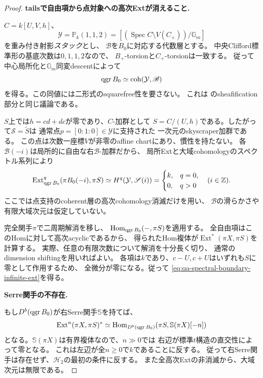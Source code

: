 \begin{proof}
\par\medskip\noindent\textbf{tailsで自由項から点対象への高次Extが消えること.}\par\nobreak\smallskip
$C=k[U,V,h]$、
\[
 \mathcal Y=\mathbb P_k(1,1,2)
 =[(\operatorname{Spec}C\setminus V(C_+))/\mathbb G_m]
\]
を重み付き射影\emph{スタック}とし、
$\mathscr B$を$B_0$に対応する代数層とする。
中央Clifford標準形の基底次数は$0,1,1,2$なので、
$B_+$-torsionと$C_+$-torsionは一致する。
従って中心局所化と$\mathbb G_m$同変descentによって
\[
 \operatorname{qgr} B_0\simeq\operatorname{coh}(\mathcal Y,\mathscr B)
\]
を得る。この同値には二形式のsquarefree性を要さない。
これは\cite[\texttt{prop:nc-qgr-weighted}の証明]{QuadricModuli2026}
のsheafification部分と同じ議論である。

$S$上では$h=cd+dc$が零であり、$C$-加群として
$S=C/(U,h)$である。したがって$\mathscr S=\widetilde S$は
通常点$p=[0:1:0]\in\mathcal Y$に支持された
一次元のskyscraper加群である。
この点は次数一座標$V$が非零のaffine chartにあり、慣性を持たない。
各$\mathscr B(-i)$は局所的に自由な右$\mathscr B$-加群だから、
局所Extと大域cohomologyのスペクトル系列により
\[
 \operatorname{Ext}^q_{\operatorname{qgr} B_0}(\pi B_0(-i),\pi S)
 \simeq H^q(\mathcal Y,\mathscr S(i))
 =\begin{cases}k,&q=0,\\0,&q>0\end{cases}
 \quad(i\in\mathbb Z).
\]
ここでは点支持のcoherent層の高次cohomology消滅だけを用い、
$\mathscr B$の滑らかさや有限大域次元は仮定していない。

完全関手$\pi$で二周期解消を移し、
$\operatorname{Hom}_{\operatorname{qgr} B_0}(-,\pi S)$を適用する。
全自由項はこのHomに対して高次acyclicであるから、
得られたHom複体が$\operatorname{Ext}^*(\pi X,\pi S)$を計算する。
実際、任意の有限次数について解消を十分長く切り、
通常のdimension shiftingを用いればよい。
各項は$k$であり、$c-U,c+U$はいずれも$S$に零として作用するため、
全微分が零になる。従って
\eqref{eq:qa-spectral-boundary-infinite-ext}を得る。

\par\medskip\noindent\textbf{Serre関手の不存在.}\par\nobreak\smallskip
もし$D^b(\operatorname{qgr} B_0)$が右Serre関手$\mathbb S$を持てば、
\[
 \operatorname{Ext}^n(\pi X,\pi S)^*
 \simeq
 \operatorname{Hom}_{D^b(\operatorname{qgr} B_0)}
       (\pi S,\mathbb S(\pi X)[-n])
\]
となる。$\mathbb S(\pi X)$は有界複体なので、$n\gg0$では
右辺が標準$t$構造の直交性によって零となる。
これは左辺が全$n\ge0$で$k$であることに反する。
従って右Serre関手は存在せず、$\mathcal H_2$の最初の条件に反する。
また全高次Extの非消滅から、大域次元は無限である。
\end{proof}

